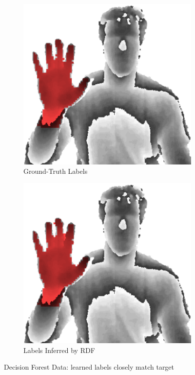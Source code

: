 \begin{figure}[ht]
\centering
        \begin{subfigure}{0.4\textwidth}
                \centering
                \includegraphics[width=\textwidth]{figures_1_hand_tracking/decision_forest_downsampled_labels_cropped}
                \caption{\footnotesize Ground-Truth Labels}
        \end{subfigure}
        \begin{subfigure}{0.4\textwidth}
                \centering
                \includegraphics[width=\textwidth]{figures_1_hand_tracking/decision_forest_generated_labels_cropped}
                \caption{\footnotesize Labels Inferred by RDF}
        \end{subfigure}
        \caption{Decision Forest Data: learned labels closely match target}
        \label{fig:rdf_data}
\end{figure}

